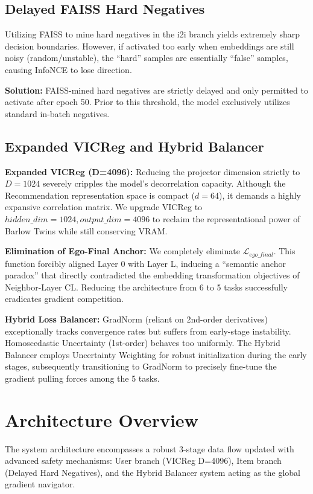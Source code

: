 \subsection{Delayed FAISS Hard Negatives}
Utilizing FAISS to mine hard negatives in the i2i branch yields extremely sharp decision boundaries. However, if activated too early when embeddings are still noisy (random/unstable), the ``hard'' samples are essentially ``false'' samples, causing InfoNCE to lose direction.

\textbf{Solution:} FAISS-mined hard negatives are strictly delayed and only permitted to activate after epoch 50. Prior to this threshold, the model exclusively utilizes standard in-batch negatives.

\subsection{Expanded VICReg and Hybrid Balancer}

\textbf{Expanded VICReg (D=4096):} 
Reducing the projector dimension strictly to $D=1024$ severely cripples the model's decorrelation capacity. Although the Recommendation representation space is compact ($d=64$), it demands a highly expansive correlation matrix. We upgrade VICReg \cite{bardes2022vicreg} to $hidden\_dim=1024, output\_dim=4096$ to reclaim the representational power of Barlow Twins while still conserving VRAM.

\textbf{Elimination of Ego-Final Anchor:} 
We completely eliminate $\mathcal{L}_{ego\_final}$. This function forcibly aligned Layer 0 with Layer L, inducing a ``semantic anchor paradox'' that directly contradicted the embedding transformation objectives of Neighbor-Layer CL. Reducing the architecture from 6 to 5 tasks successfully eradicates gradient competition.

\textbf{Hybrid Loss Balancer:} 
GradNorm \cite{chen2018gradnorm} (reliant on 2nd-order derivatives) exceptionally tracks convergence rates but suffers from early-stage instability. Homoscedastic Uncertainty \cite{kendall2018multi} (1st-order) behaves too uniformly. The Hybrid Balancer employs Uncertainty Weighting for robust initialization during the early stages, subsequently transitioning to GradNorm to precisely fine-tune the gradient pulling forces among the 5 tasks.

\section{Architecture Overview}
The system architecture encompasses a robust 3-stage data flow updated with advanced safety mechanisms: User branch (VICReg D=4096), Item branch (Delayed Hard Negatives), and the Hybrid Balancer system acting as the global gradient navigator. 

